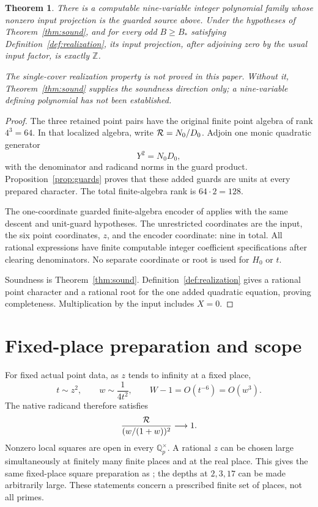 \documentclass[11pt,a4paper]{article}
\newtheorem{theorem}{Theorem}[section]
\newcommand{\Q}{\mathbb Q}\newcommand{\Z}{\mathbb Z}
\begin{document}
\begin{theorem}\label{thm:count}
There is a computable nine-variable integer polynomial family whose
nonzero input projection is the guarded source above. Under the
hypotheses of Theorem~\ref{thm:sound}, and for every odd \(B\ge B_*\)
satisfying Definition~\ref{def:realization}, its input projection,
after adjoining zero by the usual input factor, is exactly \(\Z\).

The single-cover realization property is not proved in this paper.
Without it, Theorem~\ref{thm:sound} supplies the soundness direction
only; a nine-variable defining polynomial has not been established.
\end{theorem}
\begin{proof}
The three retained point pairs have the original finite point algebra
of rank \(4^3=64\). In that localized algebra, write
\({\cal R}=N_0/D_0\). Adjoin one monic quadratic generator
\[
 Y^2=N_0D_0,
\]
with the denominator and radicand norms in the guard product.
Proposition~\ref{prop:guards} proves that these added guards are units
at every prepared character. The total finite-algebra rank is
\(64\cdot2=128\).

The one-coordinate guarded finite-algebra encoder of \cite{Unit}
applies with the same descent and unit-guard hypotheses.
The unrestricted coordinates are the input, the six point coordinates,
\(z\), and the encoder coordinate: nine in total.
All rational expressions have finite computable integer coefficient
specifications after clearing denominators. No separate coordinate
or root is used for \(H_0\) or \(t\).

Soundness is Theorem~\ref{thm:sound}.
Definition~\ref{def:realization} gives a rational point character and
a rational root for the one added quadratic equation, proving
completeness. Multiplication by the input includes \(X=0\).
\end{proof}

\section{Fixed-place preparation and scope}

For fixed actual point data, as \(z\) tends to infinity at a fixed
place,
\[
 t\sim z^2,\qquad
 w\sim\frac1{4t^2},\qquad
 W-1=O(t^{-6})=O(w^3).
\]
The native radicand therefore satisfies
\[
 \frac{{\cal R}}{(w/(1+w))^2}\longrightarrow1.
\]
Nonzero local squares are open in every \(\Q_p^\times\).
A rational \(z\) can be chosen large simultaneously at finitely many
finite places and at the real place. This gives the same fixed-place
square preparation as \cite{Native}; the depths at \(2,3,17\) can
be made arbitrarily large. These statements concern a prescribed
finite set of places, not all primes.
\end{document}

